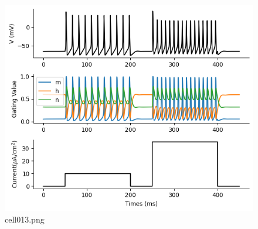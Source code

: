 \begin{figure}[ht]
	\centering
	\includegraphics[scale=0.8, max width=\linewidth]{./fig/neuron-model/hodgkin-huxley/cell013.png}
	\caption{cell013.png}
	\label{cell013.png}
\end{figure}